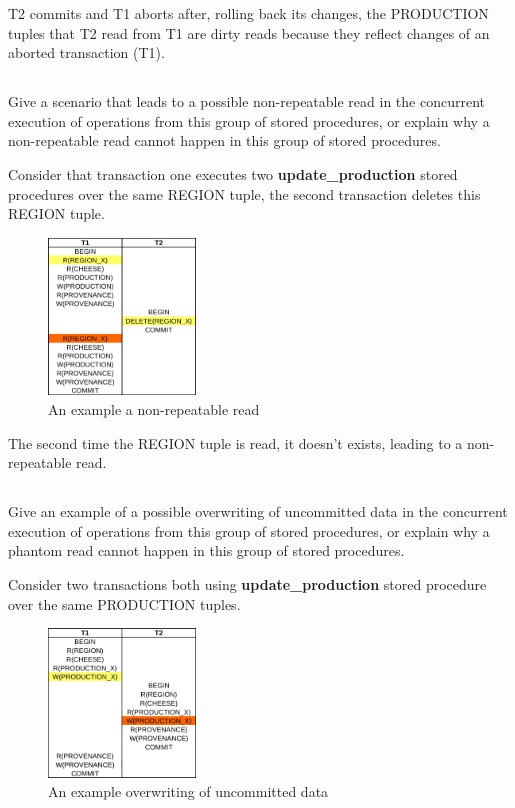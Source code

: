 T2 commits and T1 aborts after, rolling back its changes, the PRODUCTION tuples that T2 read from T1 are dirty reads because they reflect changes of an aborted transaction (T1). 

\subsection{}
{\color{gray}Give a scenario that leads to a possible non-repeatable read in the concurrent execution of operations from this group of stored procedures, or explain why a non-repeatable read cannot happen in this group of stored procedures.}

Consider that transaction one executes two \textbf{update\_production} stored procedures over the same REGION tuple, the second transaction deletes this REGION tuple.

\begin{figure}[H]
	\centering
	\includegraphics[width=0.35\textwidth]{unrepeatable_read.png}
	\caption{An example a non-repeatable read}
\end{figure}

The second time the REGION tuple is read, it doesn't exists, leading to  a non-repeatable read.

\subsection{}
{\color{gray}Give an example of a possible overwriting of uncommitted data in the concurrent execution of operations from this group of stored procedures, or explain why a phantom read cannot happen in this group of stored procedures.}

Consider two transactions both using \textbf{update\_production} stored procedure over the same PRODUCTION tuples.

\begin{figure}[H]
	\centering
	\includegraphics[width=0.35\textwidth]{overwrite_uncommit.png}
	\caption{An example overwriting of uncommitted data}
\end{figure}

